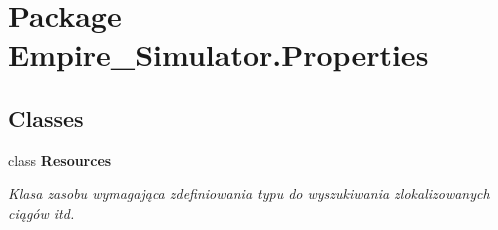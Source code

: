 \hypertarget{namespace_empire___simulator_1_1_properties}{\section{Package Empire\+\_\+\+Simulator.\+Properties}
\label{namespace_empire___simulator_1_1_properties}
}
\subsection*{Classes}
\begin{DoxyCompactItemize}
\item 
class {\bfseries Resources}
\begin{DoxyCompactList}\small\item\em Klasa zasobu wymagająca zdefiniowania typu do wyszukiwania zlokalizowanych ciągów itd. \end{DoxyCompactList}\end{DoxyCompactItemize}
